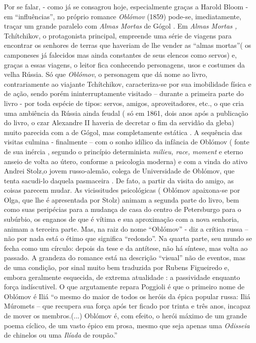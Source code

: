 Por se falar, - como já se consagrou hoje, especialmente graças a Harold
Bloom - em ``influências'', no próprio romance \emph{Oblómov} (1859)
pode-se, imediatamente, traçar um grande paralelo com \emph{Almas
Mortas} de Gógol . Em \emph{Almas Mortas ,} Tchítchikov, o protagonista
principal, empreende uma série de viagens para encontrar os senhores de
terras que haveriam de lhe vender as ``almas mortas''( os camponeses já
falecidos mas ainda constantes de seus elencos como servos) e, graças a
essas viagens, o leitor fica conhecendo personagens, usos e costumes da
velha Rússia. Só que \emph{Oblómov}, o personagem que dá nome ao livro,
contrariamente ao viajante Tchítchikov, caracteriza-se por sua
imobilidade física e de ação, sendo porém ininterruptamente visitado --
durante a primeira parte do livro - por toda espécie de tipos: servos,
amigos, aproveitadores, etc., o que cria uma ambiência da Rússia ainda
feudal ( só em 1861, dois anos após a publicação do livro, o czar
Alexandre II haveria de decretar o fim da servidão da gleba) muito
parecida com a de Gógol, mas completamente estática . A sequência das
visitas culmina - finalmente -- com o sonho idílico da infância de
Oblómov ( fonte de sua inércia , segundo o princípio determinista
\emph{milieu, race, moment} e eterno anseio de volta ao útero, conforme
a psicologia moderna) e com a vinda do ativo Andrei Stolz,o jovem
russo-alemão, colega de Universidade de Oblómov, que tenta sacudi-lo
daquela pasmaceira . De fato, a partir da visita do amigo, as coisas
parecem mudar. As vicissitudes psicológicas ( Oblómov apaixona-se por
Olga, que lhe é apresentada por Stolz) animam a segunda parte do livro,
bem como suas peripécias para a mudança de casa do centro de Petersburgo
para o subúrbio, os enganos de que é vítima e sua aproximação com a nova
senhoria, animam a terceira parte. Mas, na raiz do nome ``Oblómov'' -
diz a crítica russa -- não por nada está o étimo que significa
``redondo''. Na quarta parte, seu mundo se fecha como um círculo: depois
da tese e da antítese, não há síntese, mas volta ao passado. A grandeza
do romance está na descrição ``visual'' não de eventos, mas de uma
condição, por sinal muito bem traduzida por Rubens Figueiredo e, embora
geralmente esquecida, de extrema atualidade : a passividade enquanto
força indíscutivel. O que argutamente repara Poggioli é que o primeiro
nome de Oblómov é Iliá ``o mesmo do maior de todos os heróis da épica
popular russa: Iliá Múromets -- que recupera sua força após ter ficado
por trinta e três anos, incapaz de mover os membros.(...) Oblómov é, com
efeito, o herói máximo de um grande poema cíclico, de um vasto épico em
prosa, mesmo que seja apenas uma \emph{Odisseia} de chinelos ou uma
\emph{Ilíada} de roupão.''

